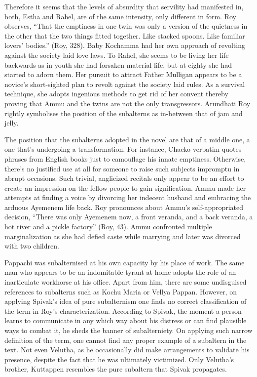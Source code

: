 Therefore it seems that the levels of absurdity that servility had manifested in, both, Estha and Rahel, are of the same intensity, only different in form. Roy observes, “That the emptiness in one twin was only a version of the quietness in the other that the two things fitted together. Like stacked spoons. Like familiar lovers’ bodies.” (Roy, 328). Baby Kochamma had her own approach of revolting against the society laid love laws. To Rahel, she seems to be living her life backwards as in youth she had forsaken material life, but at eighty she had started to adorn them. Her pursuit to attract Father Mulligan appears to be a novice’s short-sighted plan to revolt against the society laid rules. As a survival technique, she adopts ingenious methods to get rid of her convent thereby proving that Ammu and the twins are not the only transgressors. Arundhati Roy rightly symbolises the position of the subalterns as in-between that of jam and jelly. 

The position that the subalterns adopted in the novel are that of a middle one, a one that’s undergoing a transformation. For instance, Chacko verbatim quotes phrases from English books just to camouflage his innate emptiness. Otherwise, there’s no justified use at all for someone to raise such subjects impromptu in abrupt occasions. Such trivial, anglicized recitals only appear to be an effort to create an impression on the fellow people to gain signification. Ammu made her attempts at finding a voice by divorcing her indecent husband and embracing the arduous Ayemenem life back. Roy pronounces about Ammu’s self-appropriated decision, “There was only Ayemenem now, a front veranda, and a back veranda, a hot river and a pickle factory” (Roy, 43). Ammu confronted multiple marginalization as she had defied caste while marrying and later was divorced with two children. 

Pappachi was subalternised at his own capacity by his place of work. The same man who appears to be an indomitable tyrant at home adopts the role of an inarticulate workhorse at his office. Apart from him, there are some undisguised references to subalterns such as Kochu Maria or Vellya Pappan. However, on applying Spivak’s idea of pure subalternism one finds no correct classification of the term in Roy’s characterization. According to Spivak, the moment a person learns to communicate in any which way about his distress or can find plausible ways to combat it, he sheds the banner of subalterniety. On applying such narrow definition of the term, one cannot find any proper example of a subaltern in the text. Not even Velutha, as he occasionally did make arrangements to validate his presence, despite the fact that he was ultimately victimized. Only Velutha’s brother, Kuttappen resembles the pure subaltern that Spivak propagates. 

